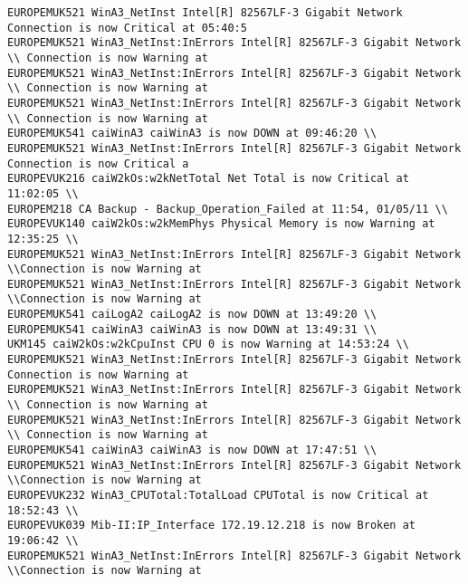 \begin{lstlisting}
EUROPEMUK521 WinA3_NetInst Intel[R] 82567LF-3 Gigabit Network Connection is now Critical at 05:40:5 
EUROPEMUK521 WinA3_NetInst:InErrors Intel[R] 82567LF-3 Gigabit Network \\ Connection is now Warning at
EUROPEMUK521 WinA3_NetInst:InErrors Intel[R] 82567LF-3 Gigabit Network \\ Connection is now Warning at
EUROPEMUK521 WinA3_NetInst:InErrors Intel[R] 82567LF-3 Gigabit Network \\ Connection is now Warning at
EUROPEMUK541 caiWinA3 caiWinA3 is now DOWN at 09:46:20 \\
EUROPEMUK521 WinA3_NetInst:InErrors Intel[R] 82567LF-3 Gigabit Network Connection is now Critical a
EUROPEVUK216 caiW2kOs:w2kNetTotal Net Total is now Critical at 11:02:05 \\
EUROPEM218 CA Backup - Backup_Operation_Failed at 11:54, 01/05/11 \\
EUROPEVUK140 caiW2kOs:w2kMemPhys Physical Memory is now Warning at 12:35:25 \\
EUROPEMUK521 WinA3_NetInst:InErrors Intel[R] 82567LF-3 Gigabit Network  \\Connection is now Warning at
EUROPEMUK521 WinA3_NetInst:InErrors Intel[R] 82567LF-3 Gigabit Network \\Connection is now Warning at
EUROPEMUK541 caiLogA2 caiLogA2 is now DOWN at 13:49:20 \\
EUROPEMUK541 caiWinA3 caiWinA3 is now DOWN at 13:49:31 \\
UKM145 caiW2kOs:w2kCpuInst CPU 0 is now Warning at 14:53:24 \\
EUROPEMUK521 WinA3_NetInst:InErrors Intel[R] 82567LF-3 Gigabit Network Connection is now Warning at
EUROPEMUK521 WinA3_NetInst:InErrors Intel[R] 82567LF-3 Gigabit Network \\ Connection is now Warning at
EUROPEMUK521 WinA3_NetInst:InErrors Intel[R] 82567LF-3 Gigabit Network \\ Connection is now Warning at
EUROPEMUK541 caiWinA3 caiWinA3 is now DOWN at 17:47:51 \\
EUROPEMUK521 WinA3_NetInst:InErrors Intel[R] 82567LF-3 Gigabit Network \\Connection is now Warning at
EUROPEVUK232 WinA3_CPUTotal:TotalLoad CPUTotal is now Critical at 18:52:43 \\
EUROPEVUK039 Mib-II:IP_Interface 172.19.12.218 is now Broken at 19:06:42 \\
EUROPEMUK521 WinA3_NetInst:InErrors Intel[R] 82567LF-3 Gigabit Network \\Connection is now Warning at

\end{lstlisting}
